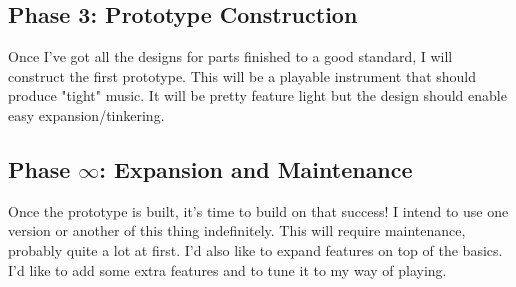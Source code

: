 \documentclass[12pt]{article}
\begin{document}
\subsection{Phase 3: Prototype Construction}
Once I've got all the designs for parts finished to a good standard, I will construct the first prototype.
This will be a playable instrument that should produce "tight" music. 
It will be pretty feature light but the design should enable easy expansion/tinkering. 

\subsection{Phase \(\infty\): Expansion and Maintenance}
Once the prototype is built, it's time to build on that success!
I intend to use one version or another of this thing indefinitely. 
This will require maintenance, probably quite a lot at first.
I'd also like to expand features on top of the basics.
I'd like to add some extra features and to tune it to my way of playing. 
\end{document}
